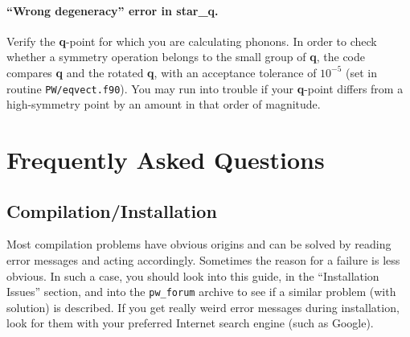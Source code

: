 \documentclass[12pt,a4paper]{article}
\begin{document}
\paragraph{``Wrong degeneracy'' error in star\_q.}

Verify the \textbf{q}-point for which you are calculating phonons.
In order to check whether a symmetry operation belongs to the small
group of \textbf{q}, the code compares \textbf{q} and the rotated
\textbf{q}, with an acceptance tolerance of $10^{-5}$ (set in routine
\texttt{PW/eqvect.f90}).
You may run into trouble if your \textbf{q}-point differs from a
high-symmetry point by an amount in that order of magnitude.

\section{Frequently Asked Questions}

\subsection{Compilation/Installation}

Most compilation problems have obvious origins and can be solved by 
reading error messages and acting accordingly. Sometimes the reason 
for a failure is less obvious. In such a case, you should look into 
this guide, in the ``Installation Issues'' section, and into the 
\texttt{pw\_forum} archive to see if a similar problem (with
solution) is described. If you get really weird error messages 
during installation, look for them with your preferred Internet
search engine (such as Google).
\end{document}
